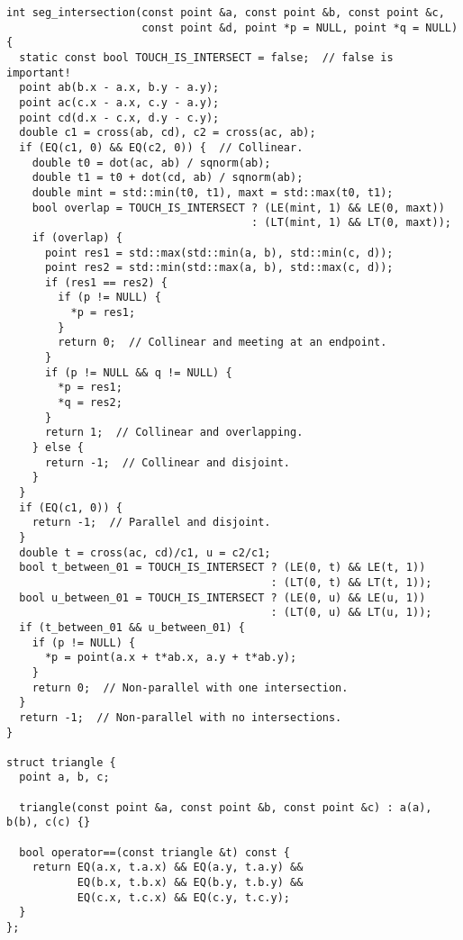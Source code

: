 \begin{lstlisting}
int seg_intersection(const point &a, const point &b, const point &c,
                     const point &d, point *p = NULL, point *q = NULL) {
  static const bool TOUCH_IS_INTERSECT = false;  // false is important!
  point ab(b.x - a.x, b.y - a.y);
  point ac(c.x - a.x, c.y - a.y);
  point cd(d.x - c.x, d.y - c.y);
  double c1 = cross(ab, cd), c2 = cross(ac, ab);
  if (EQ(c1, 0) && EQ(c2, 0)) {  // Collinear.
    double t0 = dot(ac, ab) / sqnorm(ab);
    double t1 = t0 + dot(cd, ab) / sqnorm(ab);
    double mint = std::min(t0, t1), maxt = std::max(t0, t1);
    bool overlap = TOUCH_IS_INTERSECT ? (LE(mint, 1) && LE(0, maxt))
                                      : (LT(mint, 1) && LT(0, maxt));
    if (overlap) {
      point res1 = std::max(std::min(a, b), std::min(c, d));
      point res2 = std::min(std::max(a, b), std::max(c, d));
      if (res1 == res2) {
        if (p != NULL) {
          *p = res1;
        }
        return 0;  // Collinear and meeting at an endpoint.
      }
      if (p != NULL && q != NULL) {
        *p = res1;
        *q = res2;
      }
      return 1;  // Collinear and overlapping.
    } else {
      return -1;  // Collinear and disjoint.
    }
  }
  if (EQ(c1, 0)) {
    return -1;  // Parallel and disjoint.
  }
  double t = cross(ac, cd)/c1, u = c2/c1;
  bool t_between_01 = TOUCH_IS_INTERSECT ? (LE(0, t) && LE(t, 1))
                                         : (LT(0, t) && LT(t, 1));
  bool u_between_01 = TOUCH_IS_INTERSECT ? (LE(0, u) && LE(u, 1))
                                         : (LT(0, u) && LT(u, 1));
  if (t_between_01 && u_between_01) {
    if (p != NULL) {
      *p = point(a.x + t*ab.x, a.y + t*ab.y);
    }
    return 0;  // Non-parallel with one intersection.
  }
  return -1;  // Non-parallel with no intersections.
}

struct triangle {
  point a, b, c;

  triangle(const point &a, const point &b, const point &c) : a(a), b(b), c(c) {}

  bool operator==(const triangle &t) const {
    return EQ(a.x, t.a.x) && EQ(a.y, t.a.y) &&
           EQ(b.x, t.b.x) && EQ(b.y, t.b.y) &&
           EQ(c.x, t.c.x) && EQ(c.y, t.c.y);
  }
};


\end{lstlisting}
